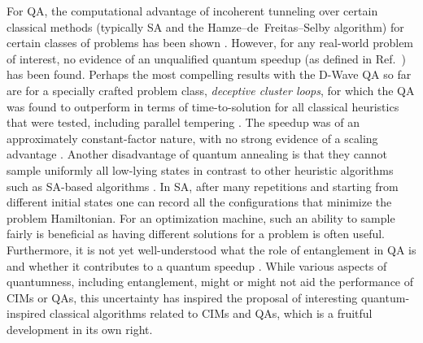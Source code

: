 \documentclass[fleqn,10pt]{wlscirep}
\def\change#1{#1}
\begin{document}
For QA, the computational advantage of incoherent tunneling over certain classical methods (typically \change{SA}\cite{kirkpatrick1983optimization} and the Hamze--de~Freitas--Selby algorithm\cite{hamze2012fields,selby2014efficient}) for certain classes of problems has been shown \cite{RevModPhys.90.015002,albash2018demonstration,PhysRevX.6.031010,denchev2016computational,boixo2016computational,mandra2018deceptive}. However, for any real-world problem of interest, no evidence of an unqualified quantum speedup (as defined in Ref.~\cite{job2018test}) has been found. Perhaps the most compelling results with the D-Wave QA so far are for a specially crafted problem class, \textit{deceptive cluster loops}, for which the QA was found to outperform in terms of time-to-solution for all classical heuristics that were tested, including parallel tempering \cite{zhu2015efficient}. The speedup was of an approximately constant-factor nature, with no strong evidence of a scaling advantage \cite{mandra2018deceptive}. \change{Another disadvantage of quantum annealing is that they cannot sample uniformly all low-lying states in contrast to other heuristic algorithms such as SA-based algorithms \cite{mandra2017exponentially,zhu2019fair}.  In SA, after many repetitions and starting from different initial states one can record all the configurations that minimize the problem Hamiltonian.  For an optimization machine, such an ability to sample fairly is beneficial as having different solutions for a problem is often useful. } Furthermore, it is not yet well-understood what the role of entanglement in QA is and whether it contributes to a quantum speedup \cite{albash2018adiabatic}.  While various aspects of quantumness, including entanglement, might or might not aid the performance of CIMs or QAs, this uncertainty has inspired the proposal of interesting quantum-inspired classical algorithms related to CIMs and QAs, which is a fruitful development in its own right. 
\end{document}
